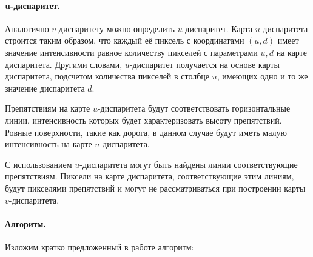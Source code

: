 \documentclass[oneside,final,12pt]{scrartcl}
\begin{document}
	 		\paragraph{u-диспаритет.} Аналогично \(v\)-диспаритету можно определить \(u\)-диспаритет. Карта \(u\)-диспаритета строится таким образом, что каждый её пиксель с координатами \(\left(u,d\right)\) имеет значение интенсивности равное количеству пикселей с параметрами \(u,d\) на карте диспаритета. Другими словами, \(u\)-диспаритет получается на основе карты диспаритета, подсчетом  количества пикселей в столбце \(u\), имеющих одно и то же значение диспаритета \(d\).

	 		Препятствиям на карте \(u\)-диспаритета будут соответствовать горизонтальные линии, интенсивность которых будет характеризовать высоту препятствий. Ровные поверхности, такие как дорога, в данном случае будут иметь малую интенсивность на карте \(u\)-диспаритета.

	 		С использованием \(u\)-диспаритета могут быть найдены линии соответствующие препятствиям. Пиксели на карте диспаритета, соответствующие этим линиям, будут пикселями препятствий и могут не рассматриваться при построении карты \(v\)-диспаритета.


	 		\paragraph{Алгоритм.} Изложим кратко предложенный в работе \cite{Zhu2013} алгоритм:
\end{document}
